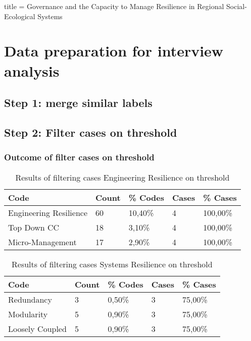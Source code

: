 title    = {Governance and the Capacity to Manage Resilience in Regional Social-Ecological Systems}\chapter{Data preparation for interview analysis}

\section{Step 1: merge similar labels}


\section{Step 2: Filter cases on threshold}



\subsection{Outcome of filter cases on threshold}

\begin{table}[H]
	\centering
	\begin{tabular}{lllll}
		\toprule
		\textbf{Code} & \textbf{Count} & \textbf{\% Codes} &\textbf{Cases} & \textbf{\% Cases} \\
		\midrule
		Engineering Resilience & 60    & 10,40\% & 4     & 100,00\% \\
		Top Down CC & 18    & 3,10\% & 4     & 100,00\% \\
		Micro-Management & 17    & 2,90\% & 4     & 100,00\% \\
		\bottomrule
	\end{tabular}%
	\caption{Results of filtering cases Engineering Resilience on threshold}%
	\label{tab:resultsfilteringengineeringresilience}%
\end{table}%

\begin{table}[H]
	\centering
	\begin{tabular}{lllll}
		\toprule
		\textbf{Code} & \textbf{Count} & \textbf{\% Codes} &\textbf{Cases} & \textbf{\% Cases} \\
		\midrule
		Redundancy & 3     & 0,50\% & 3     & 75,00\% \\
		Modularity & 5     & 0,90\% & 3     & 75,00\% \\
		Loosely Coupled & 5     & 0,90\% & 3     & 75,00\% \\
		\bottomrule
	\end{tabular}%
	\caption{Results of filtering cases Systems Resilience on threshold}%
	\label{tab:resultsfilteringsystemsresilience}%
\end{table}%

